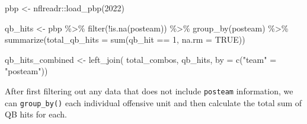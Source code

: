 \documentclass[
  letterpaper,
]{krantz}
\newenvironment{Shaded}{\begin{snugshade}}{\end{snugshade}}
\newcommand{\AttributeTok}[1]{\textcolor[rgb]{0.40,0.45,0.13}{#1}}
\newcommand{\ConstantTok}[1]{\textcolor[rgb]{0.56,0.35,0.01}{#1}}
\newcommand{\DecValTok}[1]{\textcolor[rgb]{0.68,0.00,0.00}{#1}}
\newcommand{\FunctionTok}[1]{\textcolor[rgb]{0.28,0.35,0.67}{#1}}
\newcommand{\NormalTok}[1]{\textcolor[rgb]{0.00,0.23,0.31}{#1}}
\newcommand{\OtherTok}[1]{\textcolor[rgb]{0.00,0.23,0.31}{#1}}
\newcommand{\SpecialCharTok}[1]{\textcolor[rgb]{0.37,0.37,0.37}{#1}}
\newcommand{\StringTok}[1]{\textcolor[rgb]{0.13,0.47,0.30}{#1}}
\begin{document}
\begin{Shaded}
\begin{Highlighting}[]
\NormalTok{pbp }\OtherTok{\textless{}{-}}\NormalTok{ nflreadr}\SpecialCharTok{::}\FunctionTok{load\_pbp}\NormalTok{(}\DecValTok{2022}\NormalTok{)}

\NormalTok{qb\_hits }\OtherTok{\textless{}{-}}\NormalTok{ pbp }\SpecialCharTok{\%\textgreater{}\%}
  \FunctionTok{filter}\NormalTok{(}\SpecialCharTok{!}\FunctionTok{is.na}\NormalTok{(posteam)) }\SpecialCharTok{\%\textgreater{}\%}
  \FunctionTok{group\_by}\NormalTok{(posteam) }\SpecialCharTok{\%\textgreater{}\%}
  \FunctionTok{summarize}\NormalTok{(}\AttributeTok{total\_qb\_hits =} \FunctionTok{sum}\NormalTok{(qb\_hit }\SpecialCharTok{==} \DecValTok{1}\NormalTok{, }\AttributeTok{na.rm =} \ConstantTok{TRUE}\NormalTok{))}

\NormalTok{qb\_hits\_combined }\OtherTok{\textless{}{-}} \FunctionTok{left\_join}\NormalTok{(}
\NormalTok{  total\_combos, qb\_hits, }\AttributeTok{by =} \FunctionTok{c}\NormalTok{(}\StringTok{"team"} \OtherTok{=} \StringTok{"posteam"}\NormalTok{))}
\end{Highlighting}
\end{Shaded}

After first filtering out any data that does not include
\texttt{posteam} information, we can \texttt{group\_by()} each
individual offensive unit and then calculate the total sum of QB hits
for each.
\end{document}
